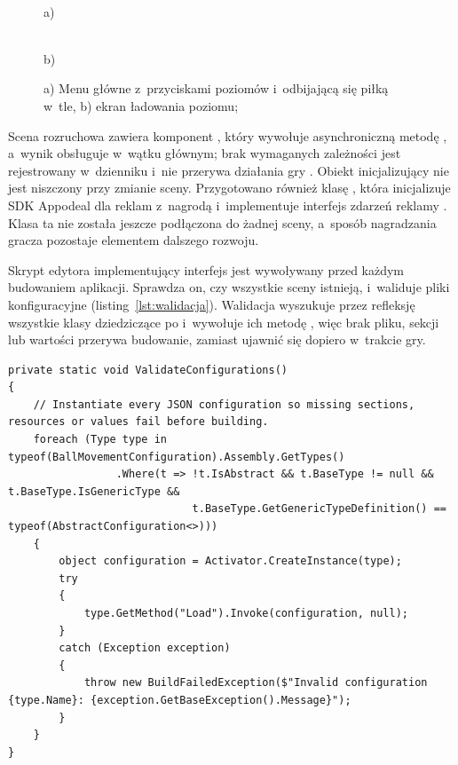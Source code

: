 \begin{figure}[!htb]
  \centering
  \begin{minipage}{0.49\textwidth}
    \centering
    \\[2pt]
    {\small a)}
  \end{minipage}\hfill
  \begin{minipage}{0.49\textwidth}
    \centering
    \\[2pt]
    {\small b)}
  \end{minipage}
  \caption{a) Menu główne z~przyciskami poziomów i~odbijającą się piłką w~tle, b) ekran
    ładowania poziomu; \zrodloWlasne}
  \label{rys:menu}
\end{figure}

Scena rozruchowa zawiera komponent , który wywołuje
asynchroniczną metodę , a~wynik obsługuje
w~wątku głównym; brak wymaganych zależności jest rejestrowany w~dzienniku i~nie przerywa
działania gry \cite{firebase-unity}. Obiekt inicjalizujący nie jest niszczony przy zmianie
sceny. Przygotowano również klasę , która inicjalizuje SDK Appodeal dla
reklam z~nagrodą i~implementuje interfejs zdarzeń reklamy \cite{appodeal}. Klasa ta nie
została jeszcze podłączona do żadnej sceny, a~sposób nagradzania gracza pozostaje
elementem dalszego rozwoju.

Skrypt edytora implementujący interfejs  jest wywoływany
przed każdym budowaniem aplikacji. Sprawdza on, czy wszystkie sceny istnieją, i~waliduje
pliki konfiguracyjne (listing~\ref{lst:walidacja}). Walidacja wyszukuje przez refleksję
wszystkie klasy dziedziczące po  i~wywołuje ich metodę
, więc brak pliku, sekcji lub wartości przerywa budowanie, zamiast ujawnić się
dopiero w~trakcie gry.

\begin{lstlisting}[caption={Walidacja plików konfiguracyjnych przed budowaniem; \zrodloWlasne},label=lst:walidacja]
private static void ValidateConfigurations()
{
    // Instantiate every JSON configuration so missing sections, resources or values fail before building.
    foreach (Type type in typeof(BallMovementConfiguration).Assembly.GetTypes()
                 .Where(t => !t.IsAbstract && t.BaseType != null && t.BaseType.IsGenericType &&
                             t.BaseType.GetGenericTypeDefinition() == typeof(AbstractConfiguration<>)))
    {
        object configuration = Activator.CreateInstance(type);
        try
        {
            type.GetMethod("Load").Invoke(configuration, null);
        }
        catch (Exception exception)
        {
            throw new BuildFailedException($"Invalid configuration {type.Name}: {exception.GetBaseException().Message}");
        }
    }
}
\end{lstlisting}
